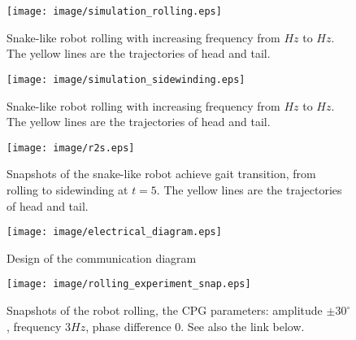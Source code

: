 \documentclass[letterpaper, 10 pt, conference]{ieeeconf}
\begin{document}
\begin{figure}[thpb]
\centering
    \texttt{[image: image/simulation\_rolling.eps]}
    \caption{Snake-like robot rolling with increasing frequency from $Hz$ to $Hz$. The yellow lines are the trajectories of head and tail.}
    \label{simulation_rolling}
\end{figure}

\begin{figure}[thpb]
    \centering
    \texttt{[image: image/simulation\_sidewinding.eps]}
    \caption{Snake-like robot rolling with increasing frequency from $Hz$ to $Hz$. The yellow lines are the trajectories of head and tail.}
    \label{simulation_sidewinding}
\end{figure}

\begin{figure*}[thpb]
\centering
\texttt{[image: image/r2s.eps]}
\caption{Snapshots of the snake-like robot achieve gait transition, from rolling to sidewinding at $t=5$. The yellow lines are the trajectories of head and tail. }
\label{r2s_snap}
\end{figure*}

\begin{figure*}[thpb]
\centering
\texttt{[image: image/electrical\_diagram.eps]}
\caption{Design of the communication diagram}
\label{electrical_diagram}
\end{figure*}
\begin{figure*}[thpb]
\centering
\texttt{[image: image/rolling\_experiment\_snap.eps]}
\caption{Snapshots of the robot rolling, the CPG parameters: amplitude $\pm30^{\circ}$, frequency $3Hz$, phase difference $0$. See also the link below.}
\label{rolling_experiment_snap.eps}
\end{figure*}
\end{document}
